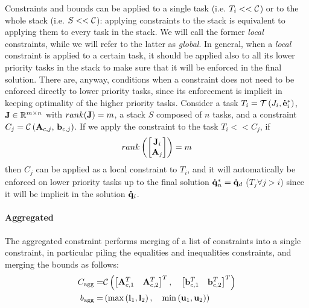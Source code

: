 Constraints and bounds can be applied to a single task (i.e. $T_i << \mathcal{C}$) or to the whole stack (i.e. $S << \mathcal{C}$): applying constraints to the stack is equivalent to applying them to every task in the stack.
We will call the former \emph{local} constraints, while we will refer to the latter as \emph{global}. In general, when a \emph{local} constraint is applied to a certain task, it should be applied also to all its lower priority tasks in the stack to make sure that it will be enforced in the final solution. There are, anyway, conditions when a constraint does not need to be enforced directly to lower priority tasks, since its enforcement is implicit in keeping optimality of the higher priority tasks.
Consider a task $T_i=\mathcal{T}\left(J_i,\mathbf{\dot{e}}^*_i\right)$, $\mathbf{J} \in \mathbb{R}^{m\times n}$ with $rank(\mathbf{J}) = m$, a stack $S$ composed of $n$ tasks, and a constraint $C_j=\mathcal{C}\left(\mathbf{A}_{c,j},\,\mathbf{b}_{c,j}\right)$. If we apply the constraint to the task $T_i << C_j$, if 
\begin{equation}
rank\left ( \begin{bmatrix}
\mathbf{J}_i\\ 
\mathbf{A}_j
\end{bmatrix} \right ) = m
\end{equation}
then $C_j$ can be applied as a local constraint to $T_i$, and it will automatically be enforced on lower priority tasks up to the final solution $\mathbf{\dot{q}}_n^*=\mathbf{\dot{q}}_d$ ($T_j \forall j>i$) since it will be implicit in the solution $\mathbf{\dot{q}}_i$.

\paragraph{Aggregated}
The aggregated constraint performs merging of a list of constraints into a single constraint, in particular piling the equalities and inequalities constraints, and merging the bounds as follows:
\begin{eqnarray}
C_{\text{agg}} = & \mathcal{C}\left( \left[ \mathbf{A}_{c,1}^T \quad \mathbf{A}_{c,2}^T \right]^T,\quad \left[ \mathbf{b}_{c,1}^T \quad \mathbf{b}_{c,2}^T \right]^T \right) \\
b_{\text{agg}} = & \left( \max\left(\textbf{l}_1,\textbf{l}_2 \right), \quad \min\left(\textbf{u}_1,\textbf{u}_2\right) \right)
\end{eqnarray}

